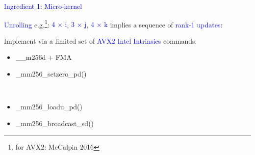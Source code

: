 \documentclass[11pt]{beamer}
\begin{document}
\begin{frame}[fragile]{\textcolor{blue}{Ingredient 1: Micro-kernel}}

\textcolor{blue}{Unrolling} e.g.\footnote{for AVX2:  McCalpin 2016 
}: \textcolor{blue}{4 $\times$ i}, \textcolor{blue}{3 $\times$ j}, \textcolor{blue}{4 $\times$ k} implies a  sequence of \textcolor{blue}{rank-1 updates}:

\begin{small}
\begin{figure}
    \centering
    \def\svgwidth{0.4\columnwidth}
    \qquad
    \def\svgwidth{0.4\columnwidth}
    
    
    \vspace{0.2cm}
    
    \def\svgwidth{0.4\columnwidth}
    \qquad
    \def\svgwidth{0.4\columnwidth}
    
\end{figure}
\end{small}
%

Implement via a limited set of \textcolor{blue}{AVX2 Intel Intrinsics} commands:

\vspace{0.3cm}

\begin{minipage}{0.5\textwidth}
\begin{itemize}
\item \_\_m256d + FMA 
\item \_mm256\_setzero\_pd()
\end{itemize}
\end{minipage}~
\begin{minipage}{0.5\textwidth}
\begin{itemize}
\item \_mm256\_loadu\_pd()
\item \_mm256\_broadcast\_sd()
\end{itemize}
\end{minipage}


\end{frame}
\end{document}
